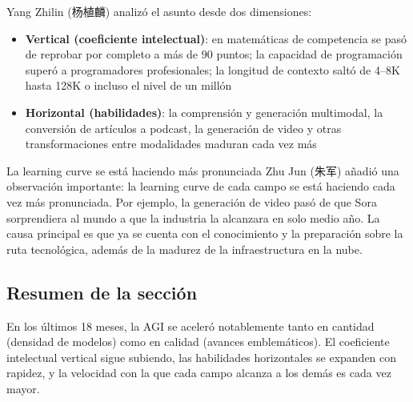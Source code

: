 Yang Zhilin (杨植麟) analizó el asunto desde dos dimensiones:

\begin{itemize}
\item \textbf{Vertical (coeficiente intelectual)}: en matemáticas de competencia se pasó de reprobar por completo a más de 90 puntos; la capacidad de programación superó a programadores profesionales; la longitud de contexto saltó de 4--8K hasta 128K o incluso el nivel de un millón
\item \textbf{Horizontal (habilidades)}: la comprensión y generación multimodal, la conversión de artículos a podcast, la generación de video y otras transformaciones entre modalidades maduran cada vez más
\end{itemize}

\begin{knowledgebox}{La learning curve se está haciendo más pronunciada}
Zhu Jun (朱军) añadió una observación importante: la learning curve de cada campo se está haciendo cada vez más pronunciada. Por ejemplo, la generación de video pasó de que Sora sorprendiera al mundo a que la industria la alcanzara en solo medio año. La causa principal es que ya se cuenta con el conocimiento y la preparación sobre la ruta tecnológica, además de la madurez de la infraestructura en la nube.
\end{knowledgebox}

\subsection{Resumen de la sección}

En los últimos 18 meses, la AGI se aceleró notablemente tanto en cantidad (densidad de modelos) como en calidad (avances emblemáticos). El coeficiente intelectual vertical sigue subiendo, las habilidades horizontales se expanden con rapidez, y la velocidad con la que cada campo alcanza a los demás es cada vez mayor.
